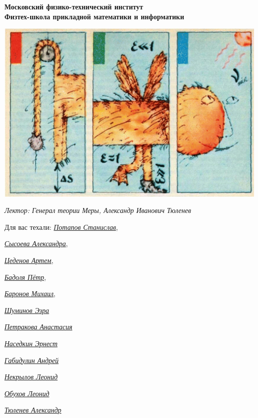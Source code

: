 \begin{titlepage}
	\clearpage\thispagestyle{empty}
	\centering
	
	\textbf{Московский физико-технический институт \\ Физтех-школа прикладной математики и информатики}
	\vspace{50pt}
    
    \noindent 
    \includegraphics[width=1.0\textwidth]{Pictures/title}
    \vspace{10pt}

 
 
     \textit{\large{Лектор: Генерал теории Меры, Александр Иванович Тюленев}
} 

	\vfill
	\begin{flushright}
    \noindent
    Для вас техали: \href{https://vk.com/invader17}{\textit{Потапов Станислав}}, 
  
    \href{https://vk.com/salexame}{\textit{ Сысоева Александра}}, 
    
    \href{https://vk.com/darkness11235}{\textit{ Цеденов Артем}},  
    
    \href{https://vk.com/akzium}{\textit{Бадоля Пётр}},
    
    \href{https://vk.com/id389655743}{\textit{Баронов Михаил}},

    \href{https://t.me/YamSuf}{\textit{Шуминов Эзра}}
    
    \href{https://vk.com/prizrakkota}{\textit{Петракова Анастасия}}

    \href{https://t.me/d3voo}{\textit{Наседкин Эрнест}}
    
    \href{https://t.me/andreygabi}{\textit{Габидулин Андрей}}
    
    \href{https://t.me/leonid_n_n}{\textit{Некрылов Леонид}}

    \href{https://t.me/oleonids}{\textit{Обухов Леонид}}
    
    \href{https://t.me/alexander_math_123}{\textit{Тюленев Александр}}

    
  
	\end{flushright}


	\pagebreak
\end{titlepage}
